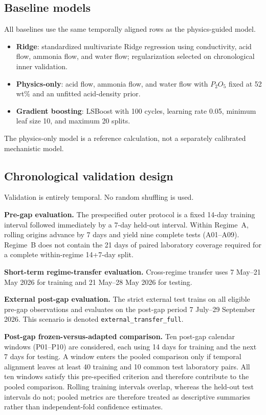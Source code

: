 \documentclass[11pt]{article}
\begin{document}
\subsection{Baseline models}

All baselines use the same temporally aligned rows as the physics-guided model.

\begin{itemize}[leftmargin=1.5em]
\item \textbf{Ridge}: standardized multivariate Ridge regression using conductivity, acid flow, ammonia flow, and water flow; regularization selected on chronological inner validation.
\item \textbf{Physics-only}: acid flow, ammonia flow, and water flow with $P_2O_5$ fixed at 52 wt\% and an unfitted acid-density prior.
\item \textbf{Gradient boosting}: LSBoost with 100 cycles, learning rate 0.05, minimum leaf size 10, and maximum 20 splits.
\end{itemize}

The physics-only model is a reference calculation, not a separately calibrated mechanistic model.

\subsection{Chronological validation design}

Validation is entirely temporal. No random shuffling is used.

\textbf{Pre-gap evaluation.} The prespecified outer protocol is a fixed 14-day training interval followed immediately by a 7-day held-out interval. Within Regime~A, rolling origins advance by 7 days and yield nine complete tests (A01--A09). Regime~B does not contain the 21 days of paired laboratory coverage required for a complete within-regime 14+7-day split.

\textbf{Short-term regime-transfer evaluation.} Cross-regime transfer uses 7 May--21 May 2026 for training and 21 May--28 May 2026 for testing.

\textbf{External post-gap evaluation.} The strict external test trains on all eligible pre-gap observations and evaluates on the post-gap period 7 July--29 September 2026. This scenario is denoted \texttt{external\_transfer\_full}.

\textbf{Post-gap frozen-versus-adapted comparison.} Ten post-gap calendar windows (P01--P10) are considered, each using 14 days for training and the next 7 days for testing. A window enters the pooled comparison only if temporal alignment leaves at least 40 training and 10 common test laboratory pairs. All ten windows satisfy this pre-specified criterion and therefore contribute to the pooled comparison. Rolling training intervals overlap, whereas the held-out test intervals do not; pooled metrics are therefore treated as descriptive summaries rather than independent-fold confidence estimates.
\end{document}
